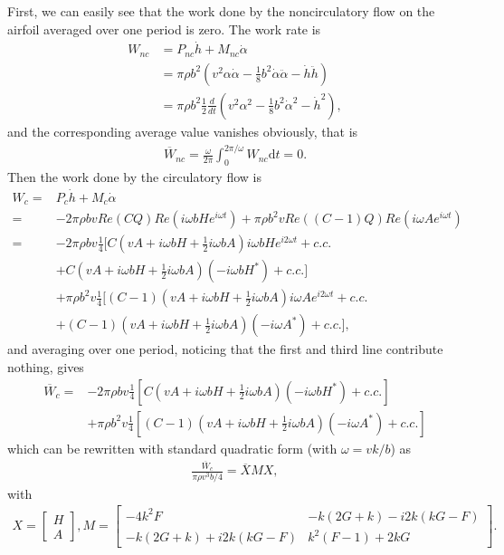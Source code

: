 First, we can easily see that the work done by the noncirculatory flow on the airfoil averaged over one period is zero. The work rate is
\begin{align}
W_{nc} & =  P_{nc} \dot{h} + M_{nc} \dot{\alpha}  \\
       & =  \pi \rho b^2 (v^2 \alpha \dot{\alpha} - \frac{1}{8} b^2 \dot{\alpha} \ddot{\alpha} - \dot{h} \ddot{h})  \\
       & =  \pi \rho b^2 \frac{1}{2} \frac{d}{dt} (v^2 {\alpha}^2 - \frac{1}{8} b^2 {\dot{\alpha}}^2 - {\dot{h}}^2 ),
\end{align}
and the corresponding average value vanishes obviously, that is
\begin{align}
\overline{W}_{nc} = \frac{\omega}{2\pi} \int_{0}^{2\pi/\omega} W_{nc} \mathrm{d}t = 0.
\end{align}
Then the work done by the circulatory flow is
\begin{align}
W_{c}  = & P_{c} \dot{h} + M_{c} \dot{\alpha}  \\
        = & -2\pi \rho b v Re(CQ) Re(i\omega bH e^{i\omega t}) + \pi \rho b^2 v Re((C-1)Q) Re(i\omega A e^{i\omega t})  \\
    = & -2\pi \rho b v \frac{1}{4} [ C(vA+i\omega bH + \frac{1}{2} i\omega bA)i\omega bH e^{i2\omega t} + c.c. \\
       &  + C(vA+i\omega bH + \frac{1}{2} i\omega bA) (-i\omega bH^{*}) + c.c.]  \\
      &  +\pi \rho b^2 v \frac{1}{4} [ (C-1)(vA+i\omega bH + \frac{1}{2} i\omega bA)i\omega A e^{i2\omega t} + c.c. \\
      &   + (C-1)(vA+i\omega bH + \frac{1}{2} i\omega bA) (-i\omega A^{*}) + c.c.],
\end{align}
and averaging over one period, noticing that the first and third line contribute nothing, gives 
\begin{align}
\overline{W}_{c}  = & -2\pi \rho b v \frac{1}{4} [C(vA+i\omega bH + \frac{1}{2} i\omega bA) (-i\omega bH^{*}) + c.c.]     \\
                                  & +\pi \rho b^2 v \frac{1}{4} [(C-1)(vA+i\omega bH + \frac{1}{2} i\omega bA) (-i\omega A^{*}) + c.c.]
\end{align}
which can be rewritten with standard quadratic form (with $\omega = vk/b$) as
\begin{align}
\frac{\overline{W}_{c}}{ \pi \rho v^3 b/4} = \overline{X} M X,
\end{align}
with
\begin{align}
X =  \begin{bmatrix} H  \\  A   \end{bmatrix},
M = \begin{bmatrix}   -4k^2 F   &  -k(2G+k) - i2k(kG-F)  \\
                         -k(2G+k) + i2k(kG-F)  &   k^2(F-1)+2kG  \end{bmatrix}.
\end{align}

